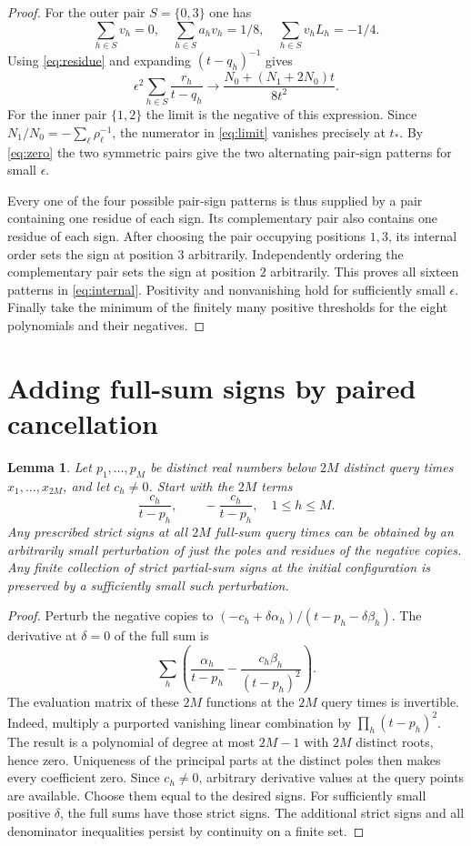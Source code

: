 \documentclass[11pt]{article}
\newtheorem{lemma}{Lemma}
\begin{document}
\begin{proof}
For the outer pair $S=\{0,3\}$ one has
\[
 \sum_{h\in S}v_h=0,\quad
 \sum_{h\in S}a_hv_h=1/8,\quad
 \sum_{h\in S}v_hL_h=-1/4.
\]
Using \eqref{eq:residue} and expanding $(t-q_h)^{-1}$ gives
\[
 \epsilon^2\sum_{h\in S}\frac{r_h}{t-q_h}
 \longrightarrow
 \frac{N_0+(N_1+2N_0)t}{8t^2}.
 \tag{6}\label{eq:limit}
\]
For the inner pair $\{1,2\}$ the limit is the negative of this
expression. Since $N_1/N_0=-\sum_\ell\rho_\ell^{-1}$,
the numerator in \eqref{eq:limit} vanishes precisely at $t_*$.
By \eqref{eq:zero} the two symmetric pairs give the two alternating
pair-sign patterns for small $\epsilon$.

Every one of the four possible pair-sign patterns is thus supplied by
a pair containing one residue of each sign. Its complementary pair
also contains one residue of each sign. After choosing the pair occupying
positions $1,3$, its internal order sets the sign at position $3$
arbitrarily. Independently ordering the complementary pair sets the
sign at position $2$ arbitrarily. This proves all sixteen patterns
in \eqref{eq:internal}. Positivity and nonvanishing hold for sufficiently
small $\epsilon$. Finally take the minimum of the finitely many positive
thresholds for the eight polynomials and their negatives.
\end{proof}

\section{Adding full-sum signs by paired cancellation}
\begin{lemma}\label{lem:jets}
Let $p_1,\ldots,p_M$ be distinct real numbers below $2M$ distinct
query times $x_1,\ldots,x_{2M}$, and let $c_h\ne0$.
Start with the $2M$ terms
\[
 \frac{c_h}{t-p_h},\qquad -\frac{c_h}{t-p_h},\quad 1\le h\le M.
\]
Any prescribed strict signs at all $2M$ full-sum query times can be
obtained by an arbitrarily small perturbation of just the poles and
residues of the negative copies. Any finite collection of strict
partial-sum signs at the initial configuration is preserved by a
sufficiently small such perturbation.
\end{lemma}
\begin{proof}
Perturb the negative copies to
$(-c_h+\delta\alpha_h)/(t-p_h-\delta\beta_h)$.
The derivative at $\delta=0$ of the full sum is
\[
 \sum_h\left(\frac{\alpha_h}{t-p_h}
              -\frac{c_h\beta_h}{(t-p_h)^2}\right).
\]
The evaluation matrix of these $2M$ functions at the $2M$ query
times is invertible. Indeed, multiply a purported vanishing linear
combination by $\prod_h(t-p_h)^2$. The result is a polynomial of
degree at most $2M-1$ with $2M$ distinct roots, hence zero. Uniqueness
of the principal parts at the distinct poles then makes every
coefficient zero. Since $c_h\ne0$, arbitrary derivative values at
the query points are available. Choose them equal to the desired
signs. For sufficiently small positive $\delta$, the full sums have
those strict signs. The additional strict signs and all denominator
inequalities persist by continuity on a finite set.
\end{proof}
\end{document}
